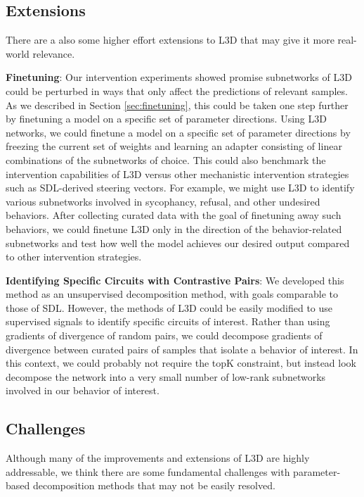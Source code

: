 \documentclass{article}
\theoremstyle{plain}
\theoremstyle{definition}
\theoremstyle{remark}
\begin{document}
\subsection{Extensions}\label{subsec:extensions}

There are a also some higher effort extensions to L3D that may give it more real-world relevance. 

\textbf{Finetuning}: Our intervention experiments showed promise subnetworks of L3D could be perturbed in ways that only affect the predictions of relevant samples. As we described in Section \ref{sec:finetuning}, this could be taken one step further by finetuning a model on a specific set of parameter directions. Using L3D networks, we could finetune a model on a specific set of parameter directions by freezing the current set of weights and learning an adapter consisting of linear combinations of the subnetworks of choice. This could also benchmark the intervention capabilities of L3D versus other mechanistic intervention strategies such as SDL-derived steering vectors. For example, we might use L3D to identify various subnetworks involved in sycophancy, refusal, and other undesired behaviors. After collecting curated data with the goal of finetuning away such behaviors, we could finetune L3D only in the direction of the behavior-related subnetworks and test how well the model achieves our desired output compared to other intervention strategies. 

\textbf{Identifying Specific Circuits with Contrastive Pairs}:
We developed this method as an unsupervised decomposition method, with goals comparable to those of SDL. However, the methods of L3D could be easily modified to use supervised signals to identify specific circuits of interest. Rather than using gradients of divergence of random pairs, we could decompose gradients of divergence between curated pairs of samples that isolate a behavior of interest. In this context, we could probably not require the topK constraint, but instead look decompose the network into a very small number of low-rank subnetworks involved in our behavior of interest. 

\subsection{Challenges}
Although many of the improvements and extensions of L3D are highly addressable, we think there are some fundamental challenges with parameter-based decomposition methods that may not be easily resolved.
\end{document}
